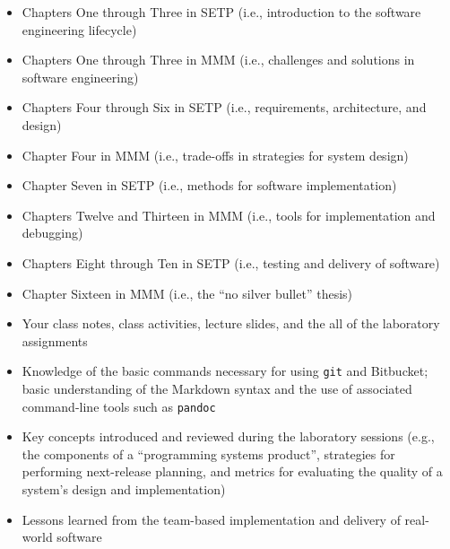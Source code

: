 \begin{itemize}

  \itemsep 0in

  \item Chapters One through Three in SETP (i.e., introduction to the software engineering lifecycle)

  \item Chapters One through Three in MMM (i.e., challenges and solutions in software engineering)

  \item Chapters Four through Six in SETP (i.e., requirements, architecture, and design)

  \item Chapter Four in MMM (i.e., trade-offs in strategies for system design)

  \item Chapter Seven in SETP (i.e., methods for software implementation)

  \item Chapters Twelve and Thirteen in MMM (i.e., tools for implementation and debugging)

  \item Chapters Eight through Ten in SETP (i.e., testing and delivery of software)

  \item Chapter Sixteen in MMM (i.e., the ``no silver bullet'' thesis)

  \item Your class notes, class activities, lecture slides, and the all of the laboratory assignments

  \item Knowledge of the basic commands necessary for using {\tt git} and Bitbucket; basic understanding of the Markdown
    syntax and the use of associated command-line tools such as {\tt pandoc}

  \item Key concepts introduced and reviewed during the laboratory sessions (e.g., the components of a ``programming
    systems product'', strategies for performing next-release planning, and metrics for evaluating the quality of a
    system's design and implementation)

  \item Lessons learned from the team-based implementation and delivery of real-world software

\end{itemize}

\vspace*{-.05in}

